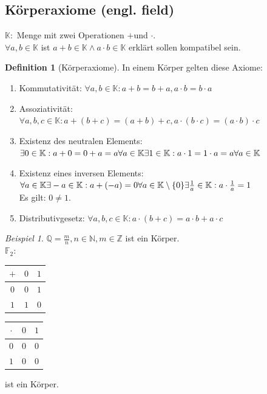 \documentclass[12pt,a4paper,titlepage]{article} %
\theoremstyle{definition}
\newtheorem{defi}[satz]{Definition}
\theoremstyle{remark}
\newtheorem*{bsp}{Beispiel}
\begin{document}
\subsection{Körperaxiome (engl. field)}
$\mathbb{K:}$ Menge mit zwei Operationen \glqq $+$\grqq und \glqq $\cdot$\grqq.\\
$\forall a,b \in \mathbb{K}$ ist $a+b\in \mathbb{K} \wedge a\cdot b \in \mathbb{K}$ erklärt sollen kompatibel sein.
\begin{defi}[Körperaxiome]
	In einem Körper gelten diese Axiome:
	\begin{enumerate}
		\item Kommutativität: $\forall a,b\in \mathbb{K}: a+b=b+a, a\cdot b=b\cdot a$
		\item Assoziativität: $\forall a,b,c\in \mathbb{K}: a+(b+c) = (a+b)+c, a\cdot (b\cdot c) = (a\cdot b)\cdot c$
		\item Existenz des neutralen Elements: \\
		$\exists 0 \in \mathbb{K}: a + 0 = 0 + a = a \forall a\in \mathbb{K}\\
		\exists 1 \in \mathbb{K}: a \cdot 1 = 1 \cdot a = a \forall a\in\mathbb{K}$
		\item Existenz eines inversen Elements:\\
		$\forall a\in\mathbb{K}\exists -a\in\mathbb{K}:a+ (-a)=0\\
		\forall a\in\mathbb{K}\setminus\{0\}\exists \frac{1}{a}\in\mathbb{K}:a\cdot\frac{1}{a}=1$\\
		Es gilt: $0 \neq 1$.
		\item Distributivgesetz: $\forall a,b,c\in\mathbb{K}:a\cdot(b+c)=a\cdot b + a \cdot c$
	\end{enumerate}
\end{defi}
\begin{bsp}
$\mathbb{Q} = \frac{m}{n}, n \in \mathbb{N}, m\in\mathbb{Z}$ ist ein Körper.\\
$\mathbb{F}_2: $
\begin{tabular}{c|cc}
	$+$ & $0$ & $1$\\
	\hline
	$0$ & $0$ & $1$\\
	$1$ & $1$ & $0$
\end{tabular}
\begin{tabular}{c|cc}
	$\cdot$ & $0$ & $1$\\
	\hline
	$0$ & $0$ & $0$\\
	$1$ & $0$ & $0$
\end{tabular}
ist ein Körper.
\end{bsp}
\end{document}
